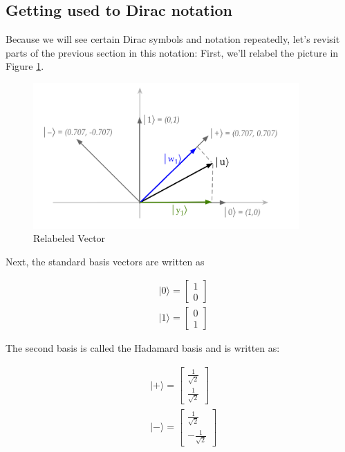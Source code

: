 \documentclass[main.tex]{subfiles}
\begin{document}
\subsection{Getting used to Dirac notation}

    Because we will see certain Dirac symbols and notation repeatedly, let's revisit parts of the previous section in this notation: First, we'll relabel the picture in Figure \ref{fig:20basischange2}.
    
    \begin{figure}
        \centering
        \includegraphics[width=4in]{notes/figs/n04/20basischange2.png}
        \caption{Relabeled Vector}
        \label{fig:20basischange2}
    \end{figure}
    
    Next, the standard basis vectors are written as
    
    $$
    \begin{aligned}
    &|0\rangle=\left[\begin{array}{l}
    1 \\
    0
    \end{array}\right] \\
    &|1\rangle=\left[\begin{array}{l}
    0 \\
    1
    \end{array}\right]
    \end{aligned}
    $$
    
    The second basis is called the Hadamard basis and is written as:
    
    $$
    \begin{aligned}
    &|+\rangle=\left[\begin{array}{c}
    \frac{1}{\sqrt{2}} \\
    \frac{1}{\sqrt{2}}
    \end{array}\right] \\
    &|-\rangle=\left[\begin{array}{r}
    \frac{1}{\sqrt{2}} \\
    -\frac{1}{\sqrt{2}}
    \end{array}\right]
    \end{aligned}
    $$
    
\end{document}
